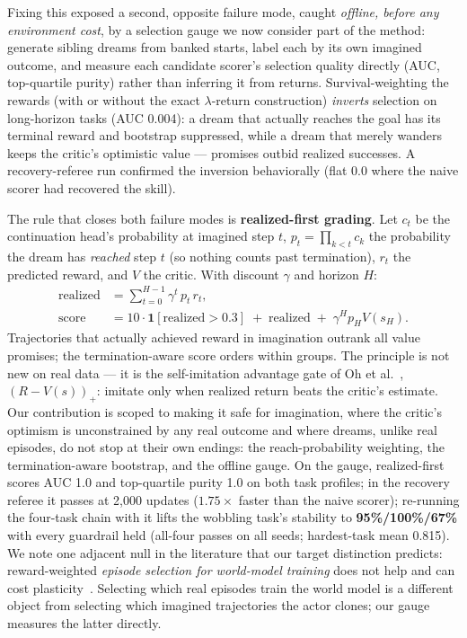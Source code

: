 \documentclass[10pt]{article}
\begin{document}
Fixing this exposed a second, opposite failure mode, caught \emph{offline, before any
environment cost}, by a selection gauge we now consider part of the method: generate sibling
dreams from banked starts, label each by its own imagined outcome, and measure each
candidate scorer's selection quality directly (AUC, top-quartile purity) rather than
inferring it from returns. Survival-weighting the rewards (with or without the exact
$\lambda$-return construction) \emph{inverts} selection on long-horizon tasks (AUC 0.004): a
dream that actually reaches the goal has its terminal reward and bootstrap suppressed, while
a dream that merely wanders keeps the critic's optimistic value --- promises outbid realized
successes. A recovery-referee run confirmed the inversion behaviorally (flat 0.0 where the
naive scorer had recovered the skill).

The rule that closes both failure modes is \textbf{realized-first grading}. Let $c_t$ be the
continuation head's probability at imagined step $t$, $p_t = \prod_{k<t} c_k$ the
probability the dream has \emph{reached} step $t$ (so nothing counts past termination),
$r_t$ the predicted reward, and $V$ the critic. With discount $\gamma$ and horizon $H$:
\begin{equation}
\label{eq:score}
\begin{aligned}
\text{realized} &= \sum_{t=0}^{H-1} \gamma^{t}\, p_t\, r_t,\\
\text{score} &= 10 \cdot \mathbf{1}[\text{realized} > 0.3] \;+\; \text{realized}
\;+\; \gamma^{H} p_H V(s_H).
\end{aligned}
\end{equation}
Trajectories that actually achieved reward in imagination outrank all value promises; the
termination-aware score orders within groups. The principle is not new on real data --- it
is the self-imitation advantage gate of Oh et al.~\cite{oh2018self}, $(R - V(s))_{+}$:
imitate only when realized return beats the critic's estimate. Our contribution is scoped to
making it safe for imagination, where the critic's optimism is unconstrained by any real
outcome and where dreams, unlike real episodes, do not stop at their own endings: the
reach-probability weighting, the termination-aware bootstrap, and the offline gauge. On the
gauge, realized-first scores AUC 1.0 and top-quartile purity 1.0 on both task profiles; in
the recovery referee it passes at 2{,}000 updates ($1.75\times$ faster than the naive
scorer); re-running the four-task chain with it lifts the wobbling task's stability to
\textbf{95\%/100\%/67\%} with every guardrail held (all-four passes on all seeds;
hardest-task mean 0.815). We note one adjacent null in the literature that our target
distinction predicts: reward-weighted \emph{episode selection for world-model training} does
not help and can cost plasticity~\cite[app.~D.8]{kessler2023effectiveness}. Selecting which
real episodes train the world model is a different object from selecting which imagined
trajectories the actor clones; our gauge measures the latter directly.
\end{document}
